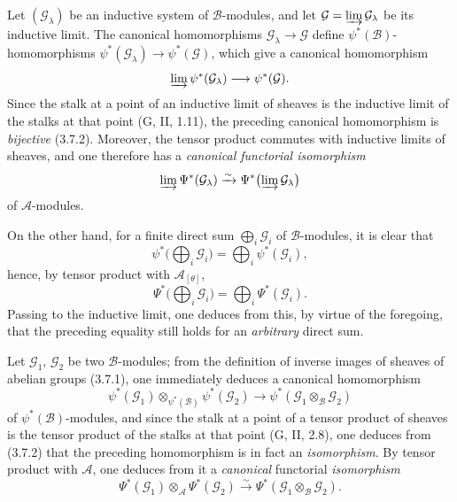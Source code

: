 \begin{env}[4.3.2]
\label{0.4.3.2}
Let $(\mathcal{G}_\lambda)$ be an inductive system of $\mathcal{B}$-modules, and
let $\mathcal{G}=\varinjlim\mathcal{G}_\lambda$ be its inductive limit. The
canonical homomorphisms $\mathcal{G}_\lambda\to\mathcal{G}$ define
$\psi^*(\mathcal{B})$-homomorphisms
$\psi^*(\mathcal{G}_\lambda)\to\psi^*(\mathcal{G})$, which give a
canonical homomorphism
\[
  \varinjlim\psi^*(\mathcal{G}_\lambda)
  \longrightarrow
  \psi^*(\mathcal{G}).
\]
Since the stalk at a point of an inductive limit of sheaves is the
inductive limit of the stalks at that point (G, II, 1.11), the preceding
canonical homomorphism is \emph{bijective} (3.7.2). Moreover, the tensor product commutes
with inductive limits of sheaves, and one therefore has a \emph{canonical
functorial isomorphism}
\[
  \varinjlim\Psi^*(\mathcal{G}_\lambda)
  \xrightarrow{\sim}
  \Psi^*\bigl(\varinjlim\mathcal{G}_\lambda\bigr)
\]
of $\mathcal{A}$-modules.

On the other hand, for a finite direct sum $\bigoplus_i\mathcal{G}_i$ of
$\mathcal{B}$-modules, it is clear that
\[
  \psi^*\bigl(\bigoplus_i\mathcal{G}_i\bigr)
  =\bigoplus_i\psi^*(\mathcal{G}_i),
\]
hence, by tensor product with $\mathcal{A}_{[\theta]}$,
\[
  \Psi^*\bigl(\bigoplus_i\mathcal{G}_i\bigr)
  =\bigoplus_i\Psi^*(\mathcal{G}_i).
  \tag{4.3.2.1}\label{0.4.3.2.1}
\]
Passing to the inductive limit, one deduces from this, by virtue of the foregoing,
that the preceding equality still holds for an \emph{arbitrary}
direct sum.
\end{env}

\begin{env}[4.3.3]\label{0.4.3.3}
Let $\mathcal{G}_1$, $\mathcal{G}_2$ be two $\mathcal{B}$-modules; from the
definition of inverse images of sheaves of abelian groups (3.7.1),
one immediately deduces a canonical homomorphism
\[
  \psi^*(\mathcal{G}_1)\otimes_{\psi^*(\mathcal{B})}\psi^*(\mathcal{G}_2)
  \longrightarrow
  \psi^*(\mathcal{G}_1\otimes_{\mathcal{B}}\mathcal{G}_2)
\]
of $\psi^*(\mathcal{B})$-modules, and since the stalk at a point of a
tensor product of sheaves is the tensor product of the stalks at that point
(G, II, 2.8), one deduces from (3.7.2) that the preceding homomorphism is in fact
an \emph{isomorphism}. By tensor product with $\mathcal{A}$, one deduces from it
a \emph{canonical} functorial \emph{isomorphism}
\[
  \Psi^*(\mathcal{G}_1)\otimes_{\mathcal{A}}\Psi^*(\mathcal{G}_2)
  \xrightarrow{\sim}
  \Psi^*(\mathcal{G}_1\otimes_{\mathcal{B}}\mathcal{G}_2).
  \tag{4.3.3.1}\label{0.4.3.3.1}
\]
\end{env}

